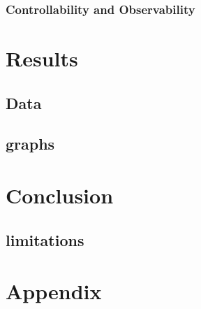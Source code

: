 \documentclass{article}
\begin{document}
\subsubsection{Controllability and Observability}

\section{Results}

\subsection{Data}
\subsection{graphs}

\section{Conclusion}
\subsection{limitations}
\section{Appendix}
\end{document}
